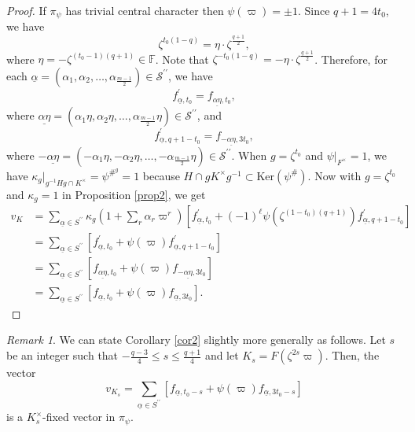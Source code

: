 \documentclass[12pt]{amsart}
\theoremstyle{definition}
\theoremstyle{remark}
\newtheorem{remark}{Remark}
\begin{document}
\begin{proof}
If $\pi_\psi$ has trivial central character then $\psi(\varpi) = \pm 1$. Since $q+1=4t_0$, we have 
\[\zeta^{t_0 (1-q)} = \eta \cdot \zeta^{\frac{q+1}{2}},\]
where $\eta=-\zeta^{(t_0-1)(q+1)} \in \mathbb F$. Note that $\zeta^{-t_0 (1-q)} = -\eta \cdot  \zeta^{\frac{q+1}{2}}$. Therefore, for each $\underline{\alpha}=(\alpha_1, \alpha_2, \dots, \alpha_{\frac{m-1}{2}}) \in \mathcal{S}^{\prime \prime}$, we have
\[f_{\underline{\alpha}, t_0}^\prime = f_{\underline{\alpha \eta}, t_0},\]
where $\underline{\alpha \eta }=(\alpha_1 \eta, \alpha_2 \eta, \dots, \alpha_{\frac{m-1}{2}}\eta) \in \mathcal{S}^{\prime \prime}$, and
\[f_{\underline{\alpha}, q+1-t_0}^\prime = f_{-\underline{\alpha \eta}, 3t_0},\]
where $-\underline{\alpha \eta} = (-\alpha_1 \eta, -\alpha_2 \eta,\dots, -\alpha_{\frac{m-1}{2}}\eta) \in \mathcal{S}^{\prime \prime}$.
When $g = \zeta^{t_0}$ and $\psi|_{F^\times} = 1$, we have $\kappa_g|_{g^{-1}Hg \cap K^\times}= \psi^{\#^g}=1$ because $H \cap g K^\times g^{-1} \subset \mathrm{Ker}(\psi^\#)$. Now with $g=\zeta^{t_0}$ and $\kappa_g=1$ in Proposition \ref{prop2},  we get 
\begin{align*}
v_K &= \sum\limits_{\underline{\alpha} \in S^{\prime \prime} } \kappa_{g}(1 + \sum\limits_{r} \alpha_r \varpi^r) \left[ f_{\underline{\alpha}, t_0}^\prime + (-1)^\ell \psi(\zeta^{(1-t_0)(q+1)})  f_{\underline{\alpha}, q+1-t_0}^\prime \right] \\
&= \sum\limits_{\underline{\alpha} \in S^{\prime \prime} } \left[ f_{\underline{\alpha}, t_0}^\prime + \psi(\varpi)   f_{\underline{\alpha}, q+1-t_0}^\prime \right] \\
&= \sum\limits_{\underline{\alpha} \in S^{\prime \prime} } \left[ f_{\underline{\alpha \eta}, t_0} + \psi(\varpi)  f_{-\underline{\alpha \eta}, 3t_0} \right] \\
& =\sum\limits_{\underline{\alpha} \in S^{\prime \prime} }  \left[f_{\underline{\alpha}, t_0} + \psi(\varpi)   f_{\underline{\alpha}, 3t_0} \right].
\end{align*}
\end{proof}

\begin{remark}\label{extra-k}
We can state Corollary \ref{cor2} slightly more generally as follows. Let $s$ be an integer such that $-\frac{q-3}{4} \leq s \leq \frac{q+1}{4}$ and let $K_s=F(\zeta^{2s} \varpi)$. Then, the vector 
\[v_{K_s}= \sum\limits_{\underline{\alpha} \in S^{\prime \prime}} [f_{\underline{\alpha}, t_0-s} + \psi(\varpi) f_{\underline{\alpha}, 3t_0-s}]\]
is a $K_s^\times$-fixed vector in $\pi_\psi$.
\end{remark}
\end{document}
